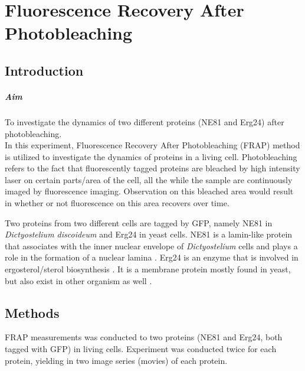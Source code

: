 
\chapter{Fluorescence Recovery After Photobleaching}
\label{chp:FRAP}

\section{Introduction}

\paragraph{Aim} To investigate the dynamics of two different proteins (NE81 and Erg24) after photobleaching.
\\

In this experiment, Fluorescence Recovery After Photobleaching (FRAP) method is utilized to investigate the dynamics of proteins in a living cell. 
Photobleaching refers to the fact that fluorescently tagged proteins are bleached by high intensity laser on certain parts/area of the cell, all the while the sample are continuously imaged by fluorescence imaging. 
Observation on this bleached area would result in whether or not fluorescence on this area recovers over time.

Two proteins from two different cells are tagged by GFP, namely NE81 in \textit{Dictyostelium discoideum} and Erg24 in yeast cells. 
NE81 is a lamin-like protein that associates with the inner nuclear envelope of \textit{Dictyostelium} cells and plays a role in the formation of a nuclear lamina \cite{Krueger2012}. 
Erg24 is an enzyme that is involved in ergosterol/sterol biosynthesis \cite{UniprotErg24}. It is a membrane protein mostly found in yeast, but also exist in other organism as well \cite{Batsios2019}.


\section{Methods}
FRAP measurements was conducted to two proteins (NE81 and Erg24, both tagged with GFP) in living cells. 
Experiment was conducted twice for each protein, yielding in two image series (movies) of each protein.

